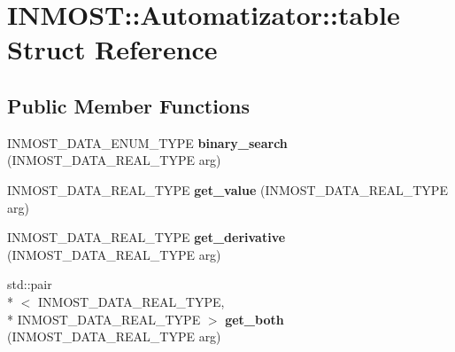 \hypertarget{structINMOST_1_1Automatizator_1_1table}{\section{I\-N\-M\-O\-S\-T\-:\-:Automatizator\-:\-:table Struct Reference}
\label{structINMOST_1_1Automatizator_1_1table}
}
\subsection*{Public Member Functions}
\begin{DoxyCompactItemize}
\item 
\hypertarget{structINMOST_1_1Automatizator_1_1table_ad3e236635d555ed1d672e8906a6a3811}{I\-N\-M\-O\-S\-T\-\_\-\-D\-A\-T\-A\-\_\-\-E\-N\-U\-M\-\_\-\-T\-Y\-P\-E {\bfseries binary\-\_\-search} (I\-N\-M\-O\-S\-T\-\_\-\-D\-A\-T\-A\-\_\-\-R\-E\-A\-L\-\_\-\-T\-Y\-P\-E arg)}\label{structINMOST_1_1Automatizator_1_1table_ad3e236635d555ed1d672e8906a6a3811}

\item 
\hypertarget{structINMOST_1_1Automatizator_1_1table_a99806737e8ead515bde8cd616738dee7}{I\-N\-M\-O\-S\-T\-\_\-\-D\-A\-T\-A\-\_\-\-R\-E\-A\-L\-\_\-\-T\-Y\-P\-E {\bfseries get\-\_\-value} (I\-N\-M\-O\-S\-T\-\_\-\-D\-A\-T\-A\-\_\-\-R\-E\-A\-L\-\_\-\-T\-Y\-P\-E arg)}\label{structINMOST_1_1Automatizator_1_1table_a99806737e8ead515bde8cd616738dee7}

\item 
\hypertarget{structINMOST_1_1Automatizator_1_1table_aeddbb19e6dcaaa6b193422ac6932387b}{I\-N\-M\-O\-S\-T\-\_\-\-D\-A\-T\-A\-\_\-\-R\-E\-A\-L\-\_\-\-T\-Y\-P\-E {\bfseries get\-\_\-derivative} (I\-N\-M\-O\-S\-T\-\_\-\-D\-A\-T\-A\-\_\-\-R\-E\-A\-L\-\_\-\-T\-Y\-P\-E arg)}\label{structINMOST_1_1Automatizator_1_1table_aeddbb19e6dcaaa6b193422ac6932387b}

\item 
\hypertarget{structINMOST_1_1Automatizator_1_1table_add262de14f3347b10e16273c5ed3872f}{std\-::pair\\*
$<$ I\-N\-M\-O\-S\-T\-\_\-\-D\-A\-T\-A\-\_\-\-R\-E\-A\-L\-\_\-\-T\-Y\-P\-E, \\*
I\-N\-M\-O\-S\-T\-\_\-\-D\-A\-T\-A\-\_\-\-R\-E\-A\-L\-\_\-\-T\-Y\-P\-E $>$ {\bfseries get\-\_\-both} (I\-N\-M\-O\-S\-T\-\_\-\-D\-A\-T\-A\-\_\-\-R\-E\-A\-L\-\_\-\-T\-Y\-P\-E arg)}\label{structINMOST_1_1Automatizator_1_1table_add262de14f3347b10e16273c5ed3872f}

\end{DoxyCompactItemize}
